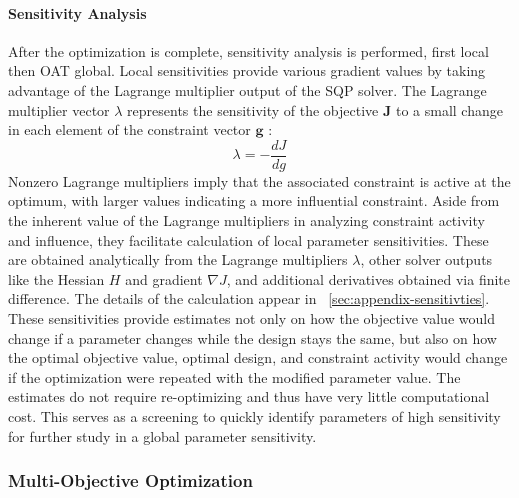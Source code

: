 \paragraph{Sensitivity Analysis}
After the optimization is complete, sensitivity analysis is performed, first local then OAT global.
Local sensitivities provide various gradient values by taking advantage of the Lagrange multiplier output of the SQP solver.
The Lagrange multiplier vector $\lambda$ represents the sensitivity of the objective $\textbf{J}$ to a small change in each element of the constraint vector $\textbf{g}$ \cite{martins_engineering_2022}:
\begin{equation}
    \lambda = -\frac{dJ}{dg} %
\end{equation}
Nonzero Lagrange multipliers imply that the associated constraint is active at the optimum, with larger values indicating a more influential constraint.
Aside from the inherent value of the Lagrange multipliers in analyzing constraint activity and influence, they facilitate calculation of local parameter sensitivities.
These are obtained analytically from the Lagrange multipliers $\lambda$, other solver outputs like the Hessian $H$ and gradient $\nabla  J$, and additional derivatives obtained via finite difference.
The details of the calculation appear in \appendixname~\ref{sec:appendix-sensitivties}.
These sensitivities provide estimates not only on how the objective value would change if a parameter changes while the design stays the same, but also on how the optimal objective value, optimal design, and constraint activity would change if the optimization were repeated with the modified parameter value.
The estimates do not require re-optimizing and thus have very little computational cost.
This serves as a screening to quickly identify parameters of high sensitivity for further study in a global parameter sensitivity. 



\subsubsection{Multi-Objective Optimization}\label{sec:multi-obj-process}
